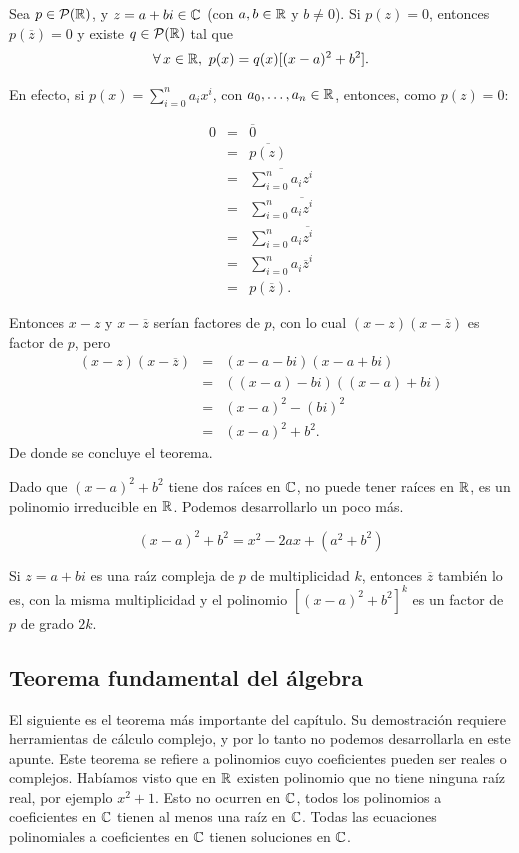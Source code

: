 \medskip

\begin{thm}
Sea  $p \in \mathcal{P}(\mathbb{R})$,  y $z=a+bi\in \mathbb{C}$ (con $a,b\in\mathbb{R}$ y $b\not = 0$). Si $p(z)=0$, entonces $p(\overline{z})=0$ y existe $q\in  \mathcal{P}(\mathbb{R})$  tal que 
$$\forall\,x\in\R,\ p(x)=q(x)[(x-a)^2+b^2].$$
\end{thm}

En efecto, si $p(x)=\sum_{i=0}^n a_ix^i$, con $a_0,\dots,a_n\in\mathbb{R}$, entonces, como $p(z)=0$:

\begin{eqnarray*}
0&=&\overline{0}\\
&=&\overline{p(z)}\\
&=&\overline{\sum_{i=0}^n a_iz^i}\\
&=&\sum_{i=0}^n \overline{a_iz^i}\\
&=&\sum_{i=0}^n a_i\overline{z^i}\\
&=&\sum_{i=0}^n a_i\overline{z}^i\\
&=&p(\overline{z}).
\end{eqnarray*}

Entonces $x-z$ y $x-\overline{z}$ serían factores de $p$, con lo cual $(x-z)(x-\overline{z})$ es factor de $p$, pero
\begin{eqnarray*}
(x-z)(x-\overline{z})&=&(x-a-bi)(x-a+bi)\\
&=&((x-a)-bi)((x-a)+bi)\\
&=&(x-a)^2-(bi)^2\\
&=&(x-a)^2+b^2.
\end{eqnarray*}
De donde se concluye el teorema.

Dado que $(x-a)^2+b^2$ tiene dos raíces en $\mathbb{C}$, no puede tener raíces en $\mathbb{R}$, es un polinomio irreducible en $\mathbb{R}$.
Podemos desarrollarlo un poco más.

$$(x-a)^2+b^2=x^2-2ax+ (a^2+b^2)$$


\begin{rem}
Si $z=a+bi$ es una ra{\'\i}z compleja de $p$ de multiplicidad $k$, entonces $\overline{z}$ tambi\'en lo es, con la misma multiplicidad y el polinomio $[(x-a)^2+b^2]^k$ es un factor de $p$ de grado $2k$.
\end{rem}


\subsection{Teorema fundamental del álgebra}

El siguiente es el teorema más importante del capítulo. Su demostración requiere herramientas de cálculo complejo, y por lo tanto no podemos desarrollarla en este apunte.
Este teorema se refiere a polinomios cuyo coeficientes pueden ser reales o complejos.
Habíamos visto que en $\mathbb{R}$ existen polinomio que no tiene ninguna raíz real, por ejemplo $x^2 +1$.
Esto no ocurren en $\mathbb{C}$, todos los polinomios a coeficientes en $\mathbb{C}$ tienen al menos una raíz en $\mathbb{C}$.
Todas las ecuaciones polinomiales a coeficientes en $\mathbb{C}$ tienen soluciones en $\mathbb{C}$.


